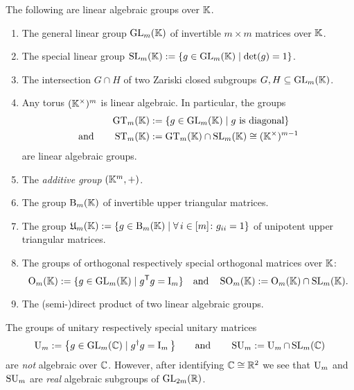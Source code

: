 \begin{example}\label{ex:LinearAlgebraicGroups}
	The following are linear algebraic groups over $\mathbb K$.
	\begin{enumerate}
		\item The general linear group $\operatorname{GL}_m(\mathbb K)$ of invertible $m \times m$ matrices over $\mathbb K$.
		
		\item The special linear group $\operatorname{SL}_m(\mathbb K) := \{g \in \operatorname{GL}_m(\mathbb K) \mid \det(g) =  1\}$.
		
		\item The intersection $G \cap H$ of two Zariski closed subgroups $G, H \subseteq \operatorname{GL}_m(\mathbb K)$.
		
		\item Any torus $(\mathbb K^{\times})^m$ is linear algebraic. In particular, the groups
			\begin{align*}
				\operatorname{GT}_m(\mathbb K) &:= \{g \in \operatorname{GL}_m(\mathbb K) \mid g \text{ is diagonal}\} \\
				\text{and} \qquad	\operatorname{ST}_m(\mathbb K) &:= \operatorname{GT}_m(\mathbb K) \cap \operatorname{SL}_m(\mathbb K) \cong (\mathbb K^\times)^{m-1}
			\end{align*}
			are linear algebraic groups.
			
		\item The \emph{additive group} $(\mathbb K^m, +)$.
			
		\item The group $\operatorname{B}_m(\mathbb K)$ of invertible upper triangular matrices.
		
		\item The group $\mathfrak{U}_m(\mathbb K) := \{ g \in  \operatorname{B}_m(\mathbb K) \mid \forall \, i \in [m] \colon g_{ii} = 1\}$ of unipotent upper triangular matrices.
		
		\item The groups of orthogonal respectively special orthogonal matrices over $\mathbb K$: 
			\[\operatorname{O}_m(\mathbb K) := \{ g \in \operatorname{GL}_m(\mathbb K) \mid g^{\mathsf{T}} g = \operatorname{I}_m\} \quad \text{and} \quad
			\operatorname{SO}_m(\mathbb K) := \operatorname{O}_m(\mathbb K) \cap \operatorname{SL}_m(\mathbb K) . \]

		\item The (semi-)direct product of two linear algebraic groups.	\hfill\exSymbol
	\end{enumerate}
\end{example}

\begin{example}\label{ex:NonAlgebraic}
	The groups of unitary respectively special unitary matrices
	\[ \operatorname{U}_m := \big\{ g \in \operatorname{GL}_m(\mathbb C) \mid g^{\dagger} g = \operatorname{I}_m \big\} \qquad \text{and} \qquad
	\operatorname{SU}_m := \operatorname{U}_m \cap \operatorname{SL}_m(\mathbb C)\]
	are \emph{not} algebraic over $\mathbb C$. However, after identifying $\mathbb C \cong \mathbb R^2$ we see that $\operatorname{U}_m$ and $\operatorname{SU}_m$ are \emph{real} algebraic subgroups of $\operatorname{GL}_{2m}(\mathbb R)$.
	\hfill\exSymbol
\end{example}

